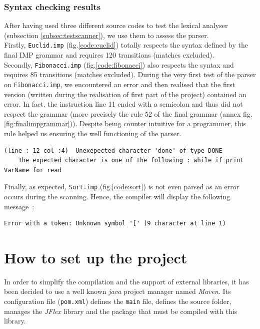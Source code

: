 \documentclass[a4paper,11pt]{article}
\begin{document}
    \subsubsection{Syntax checking results}  
      After having used three different source codes to test the lexical analyser (subsection \ref{subsec:testscanner}), we use them to assess the parser.\\
      Firstly, \verb|Euclid.imp| (fig.\ref{code:euclid}) totally respects the syntax defined by the final IMP grammar and requires 120 transitions (matches excluded).\\ %
      Secondly, \verb|Fibonacci.imp| (fig.\ref{code:fibonacci}) also respects the syntax and requires 85 transitions (matches excluded). During the very first test of the parser on \verb|Fibonacci.imp|, we encountered an error and then realised that the first version (written during the realisation of first part of the project) contained an error. In fact, the instruction line 11 ended with a semicolon and thus did not respect the grammar (more precisely the rule 52 of the final grammar (annex fig.\ref{fig:finalimpgrammar})). Despite being counter intuitive for a programmer, this rule helped us ensuring the well functioning of the parser.
        \begin{verbatim}
(line : 12 col :4)	Unexepected character 'done' of type DONE
    The expected character is one of the following : while if print VarName for read
        \end{verbatim}
    Finally, as expected, \verb|Sort.imp| (fig.\ref{code:sort}) is not even parsed as an error occurs during the scanning. Hence, the compiler will display the following message~:
      \begin{verbatim}
Error with a token: Unknown symbol '[' (9 character at line 1)
      \end{verbatim}

\section{How to set up the project}
  In order to simplify the compilation and the support of external libraries, it has been decided to use a well known \textit{java} project manager named \textit{Maven}. Its configuration file (\verb|pom.xml|) defines the \verb|main| file, defines the source folder, manages the \textit{JFlex} library and the package that must be compiled with this library.
\end{document}
